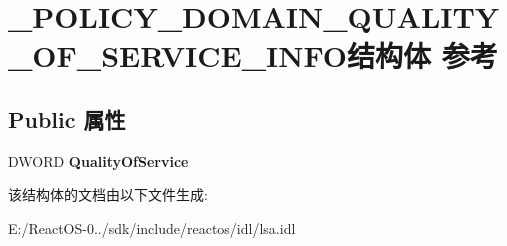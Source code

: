 \hypertarget{struct___p_o_l_i_c_y___d_o_m_a_i_n___q_u_a_l_i_t_y___o_f___s_e_r_v_i_c_e___i_n_f_o}{}\section{\+\_\+\+P\+O\+L\+I\+C\+Y\+\_\+\+D\+O\+M\+A\+I\+N\+\_\+\+Q\+U\+A\+L\+I\+T\+Y\+\_\+\+O\+F\+\_\+\+S\+E\+R\+V\+I\+C\+E\+\_\+\+I\+N\+F\+O结构体 参考}
\label{struct___p_o_l_i_c_y___d_o_m_a_i_n___q_u_a_l_i_t_y___o_f___s_e_r_v_i_c_e___i_n_f_o}
\subsection*{Public 属性}
\begin{DoxyCompactItemize}
\item 
\mbox{\label{struct___p_o_l_i_c_y___d_o_m_a_i_n___q_u_a_l_i_t_y___o_f___s_e_r_v_i_c_e___i_n_f_o_a384d01e24d18e484bfa4d2d526b3ef68}} 
D\+W\+O\+RD {\bfseries Quality\+Of\+Service}
\end{DoxyCompactItemize}


该结构体的文档由以下文件生成\+:\begin{DoxyCompactItemize}
\item 
E\+:/\+React\+O\+S-\/0../sdk/include/reactos/idl/lsa.\+idl\end{DoxyCompactItemize}
